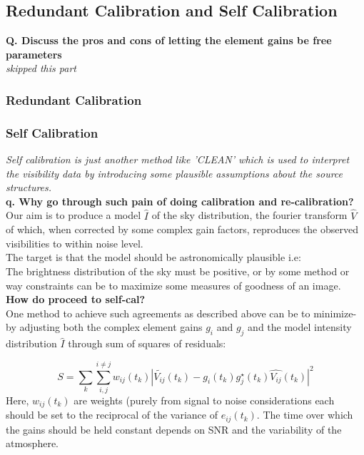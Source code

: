 \documentclass[10pt]{report}
\newcommand{\tbf}[1]{\textbf{#1}}
\newcommand{\tit}[1]{\textit{#1}}
\begin{document}
\subsection{Redundant Calibration and Self Calibration}
\tbf{Q. Discuss the pros and cons of letting the element gains be free parameters}\\

\tit{skipped this part}

\subsubsection{Redundant Calibration}

\subsubsection{Self Calibration}
\tit{Self calibration is just another method like 'CLEAN' which is used to interpret the visibility data by introducing some plausible assumptions about the source structures.}\\

\tbf{q. Why go through such pain of doing calibration and re-calibration?}\\


Our aim is to produce a model $\hat{I}$ of the sky distribution, the fourier transform $\hat{V}$ of which, when corrected by some complex gain factors, reproduces the observed visibilities to within noise level.\\

The target is that the model should be astronomically plausible i.e:\\

The brightness distribution of the sky must be positive, or by some method or way constraints can be to maximize some measures of goodness of an image.\\

\tbf{How do proceed to self-cal?}\\

One method to achieve such agreements as described above can be to minimize- by adjusting both the complex element gains $g_i$ and $g_j$ and the model intensity distribution $\hat{I}$ through sum of squares of residuals:

\begin{equation}\label{eq:ssr}
S=\sum_k \sum_{i,j}^{i \neq j} w_{ij}(t_k) |\tilde{V_{ij}}(t_k)-g_i(t_k)g^\star_j(t_k)\hat{V_{ij}}(t_k)|^2 
\end{equation}
Here, $w_{ij}(t_k)$ are weights (purely from signal to noise considerations each should be set to the reciprocal of the variance of $e_{ij}(t_k)$. The time over which the gains should be held constant depends on SNR and the variability of  
the atmosphere.\\
\end{document}

